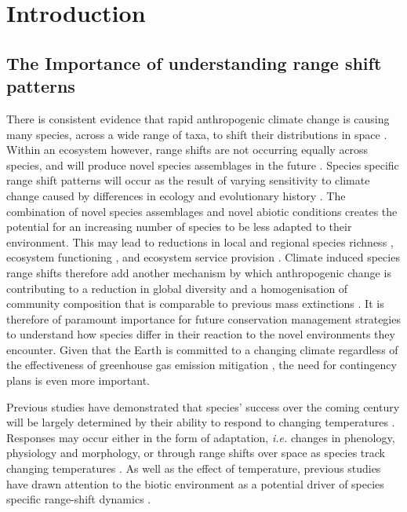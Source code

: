 \documentclass[a4paper,10pt,]{report}
\begin{document}
\clearpage
\onehalfspacing
\centering{\tableofcontents}
\clearpage
\setcounter{page}{1}
\raggedright
\chapter{Introduction}

\section{The Importance of understanding range shift patterns}
There is consistent evidence that rapid anthropogenic climate change is causing many species, across a wide range of taxa, to shift their distributions in space \citep{Hughes2000, McCarty2001, Walther2002, Parmesan2006, Loarie2009, Chen2011}. Within an ecosystem however, range shifts are not occurring equally across species, and will produce novel species assemblages in the future \citep{Hobbs2006}. Species specific range shift patterns will occur as the result of varying sensitivity to climate change caused by differences in ecology and evolutionary history \citep{Mooney2009}. The combination of novel species assemblages and novel abiotic conditions creates the potential for an increasing number of species to be less adapted to their environment. This may lead to reductions in local and regional species richness \citep{Colwell2008}, ecosystem functioning \citep{Bellard2012}, and ecosystem service provision \citep{Dobson2011, Isbell2011}. Climate induced species range shifts therefore add another mechanism by which anthropogenic change is contributing to a reduction in global diversity \citep{MillenniumEcosystemAssessment2005} and a homogenisation of community composition \citep{Dornelas2014} that is comparable to previous mass extinctions \citep{Barnosky2011}. It is therefore of paramount importance for future conservation management strategies to understand how species differ in their reaction to the novel environments they encounter. Given that the Earth is committed to a changing climate regardless of the effectiveness of greenhouse gas emission mitigation \citep{IPCC2013}, the need for contingency plans is even more important.


Previous studies have demonstrated that species' success over the coming century will be largely determined by their ability to respond to changing temperatures \citep{Colwell2008, Chen2011, Feeley2012}. Responses may occur either in the form of adaptation, \textit{i.e.} changes in phenology, physiology and morphology, or through range shifts over space as species track changing temperatures \citep{Bellard2012}. As well as the effect of temperature, previous studies have drawn attention to the biotic environment as a potential driver of species specific range-shift dynamics \citep{Ettinger2013,Araujo2007,Meier2010,VanderPutten2010,Wisz2013}.
\end{document}
